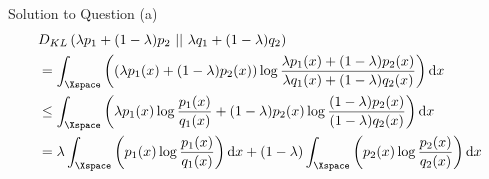 \documentclass[aspectratio=169]{beamer}
\newcommand{\kld}[1]{D_{KL}\left(#1\right)}
\begin{document}
\begin{frame}{Solution to Question (a)}
	\small
	\begin{align*}
		& \kld{\lambda p_1 + (1 - \lambda) p_2 \ || \ \lambda q_1 + (1-\lambda) q_2}  \\
		&= \int_\Xspace \left( (\lambda p_1(x) + (1 - \lambda) p_2(x)) \log \frac{\lambda p_1(x) + (1 - \lambda) p_2(x)}{\lambda q_1(x) + (1 - \lambda) q_2(x)} \right) \mathrm{d}x \\
		&\leq \int_\Xspace \left( \lambda p_1(x) \log \frac{p_1(x)}{q_1(x)} + (1-\lambda) p_2(x) \log \frac{(1 - \lambda) p_2(x)}{(1-\lambda) q_2(x)} \right) \mathrm{d}x \\
		&= \lambda \int_\Xspace \left(p_1(x) \log \frac{p_1(x)}{q_1(x)} \right) \mathrm{d}x + (1 - \lambda) \int_\Xspace \left( p_2(x) \log \frac{p_2(x)}{q_2(x)}\right) \mathrm{d}x \\
	\end{align*}
\end{frame}
\end{document}
